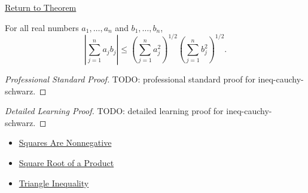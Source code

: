 \newpage
{}
\label{prf:ineq-cauchy-schwarz}

\begin{remark*}[Return]
\hyperref[thm:ineq-cauchy-schwarz]{Return to Theorem}
\end{remark*}

\begin{theorem*}
For all real numbers $a_1,\dots,a_n$ and $b_1,\dots,b_n$,
\[
\left|\sum_{j=1}^{n}a_jb_j\right|
\le
\left(\sum_{j=1}^{n}a_j^2\right)^{1/2}
\left(\sum_{j=1}^{n}b_j^2\right)^{1/2}.
\]
\end{theorem*}

\begin{proof}[Professional Standard Proof]
\LRAProofBodyStart
TODO: professional standard proof for ineq-cauchy-schwarz.
\end{proof}

\begin{proof}[Detailed Learning Proof]
\LRAProofBodyStart
TODO: detailed learning proof for ineq-cauchy-schwarz.
\end{proof}

\begin{remark*}
\end{remark*}

\begin{dependencies}
\begin{itemize}
  \item \hyperref[thm:square-nonnegative]{Squares Are Nonnegative}
  \item \hyperref[thm:sqrt-product]{Square Root of a Product}
  \item \hyperref[thm:triangle-inequality]{Triangle Inequality}
\end{itemize}
\end{dependencies}

\clearpage


